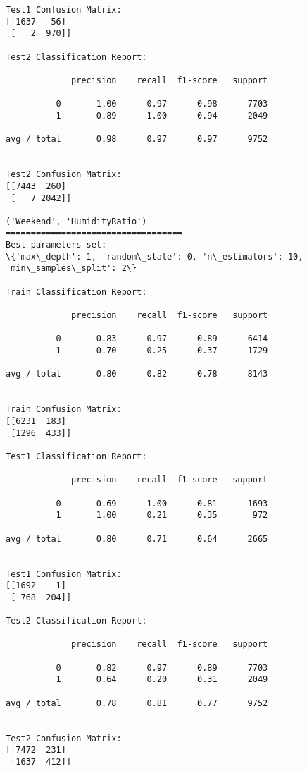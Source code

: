 \documentclass[11pt]{article}
\begin{document}
\begin{Verbatim}[commandchars=\\\{\}]
Test1 Confusion Matrix:
[[1637   56]
 [   2  970]]

Test2 Classification Report:

             precision    recall  f1-score   support

          0       1.00      0.97      0.98      7703
          1       0.89      1.00      0.94      2049

avg / total       0.98      0.97      0.97      9752


Test2 Confusion Matrix:
[[7443  260]
 [   7 2042]]

('Weekend', 'HumidityRatio')
===================================
Best parameters set:
\{'max\_depth': 1, 'random\_state': 0, 'n\_estimators': 10, 'min\_samples\_split': 2\}

Train Classification Report:

             precision    recall  f1-score   support

          0       0.83      0.97      0.89      6414
          1       0.70      0.25      0.37      1729

avg / total       0.80      0.82      0.78      8143


Train Confusion Matrix:
[[6231  183]
 [1296  433]]

Test1 Classification Report:

             precision    recall  f1-score   support

          0       0.69      1.00      0.81      1693
          1       1.00      0.21      0.35       972

avg / total       0.80      0.71      0.64      2665


Test1 Confusion Matrix:
[[1692    1]
 [ 768  204]]

Test2 Classification Report:

             precision    recall  f1-score   support

          0       0.82      0.97      0.89      7703
          1       0.64      0.20      0.31      2049

avg / total       0.78      0.81      0.77      9752


Test2 Confusion Matrix:
[[7472  231]
 [1637  412]]


    \end{Verbatim}
\end{document}
